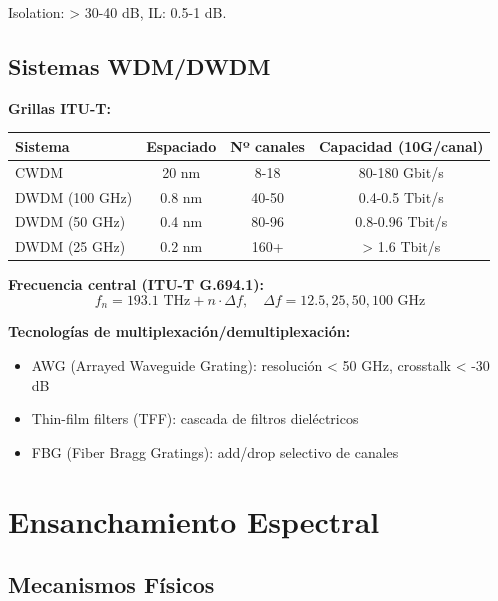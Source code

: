 \documentclass[11pt,a4paper]{article}
\begin{document}
Isolation: > 30-40 dB, IL: 0.5-1 dB.

\subsection{Sistemas WDM/DWDM}

\textbf{Grillas ITU-T:}

\begin{table}[h]
\centering
\begin{tabular}{lccc}
\hline
\textbf{Sistema} & \textbf{Espaciado} & \textbf{Nº canales} & \textbf{Capacidad (10G/canal)} \\
\hline
CWDM & 20 nm & 8-18 & 80-180 Gbit/s \\
DWDM (100 GHz) & 0.8 nm & 40-50 & 0.4-0.5 Tbit/s \\
DWDM (50 GHz) & 0.4 nm & 80-96 & 0.8-0.96 Tbit/s \\
DWDM (25 GHz) & 0.2 nm & 160+ & > 1.6 Tbit/s \\
\hline
\end{tabular}
\end{table}

\textbf{Frecuencia central (ITU-T G.694.1):}
\begin{equation}
    f_n = 193.1 \text{ THz} + n \cdot \Delta f, \quad \Delta f = 12.5, 25, 50, 100 \text{ GHz}
\end{equation}

\textbf{Tecnologías de multiplexación/demultiplexación:}
\begin{itemize}
    \item AWG (Arrayed Waveguide Grating): resolución < 50 GHz, crosstalk < -30 dB
    \item Thin-film filters (TFF): cascada de filtros dieléctricos
    \item FBG (Fiber Bragg Gratings): add/drop selectivo de canales
\end{itemize}

\section{Ensanchamiento Espectral}

\subsection{Mecanismos Físicos}
\end{document}

